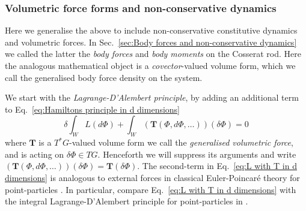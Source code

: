 \subsubsection*{Volumetric force forms and non-conservative dynamics}

Here we generalise the above to include non-conservative constitutive dynamics and volumetric forces. In Sec.~\ref{sec:Body forces and non-conservative dynamics} we called the latter the \textit{body forces} and \textit{body moments} on the Cosserat rod. Here the analogous mathematical object is a \textit{covector}-valued volume form, which we call the generalised body force density on the system.

We start with the \textit{Lagrange-D'Alembert principle}, by adding an additional term to Eq.~\ref{eq:Hamiltons principle in d dimensions}
\begin{equation} \label{eq:L with T in d dimensions}
\delta \int_W L(d\Phi) + \int_W (\mathbf{T}(\Phi, d \Phi, \dots))(\delta \Phi) = 0
\end{equation}
where $\mathbf{T}$ is a $T^*G$-valued volume form we call the \textit{generalised volumetric force}, and is acting on $\delta \Phi \in TG$. Henceforth we will suppress its arguments and write $(\mathbf{T}(\Phi, d\Phi, \dots))(\delta \Phi) = \mathbf{T}(\delta \Phi)$. The second-term in Eq.~\ref{eq:L with T in d dimensions} is analogous to external forces in classical Euler-Poincaré theory for point-particles \citep{marleHenriPoincareNote2013, marsdenIntroductionMechanicsSymmetry2013}. In particular, compare Eq.~\ref{eq:L with T in d dimensions} with the integral Lagrange-D'Alembert principle for point-particles in \citep[Eq.~7.8.5]{marsdenIntroductionMechanicsSymmetry2013}.

